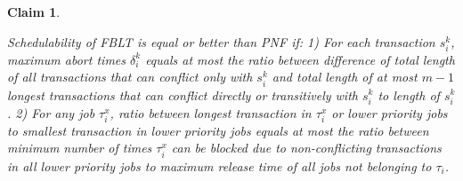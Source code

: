 \documentclass[conference,letterpaper]{IEEEtran}
\newtheorem{clm}{Claim}
\begin{document}

%

%
\begin{clm}\label{clm:fblt_pnf_edf}

Schedulability of FBLT is equal or better than PNF if: 1) For each
transaction $s_{i}^{k}$, maximum abort times $\delta_{i}^{k}$ equals
at most the ratio between difference of total length of all transactions
that can conflict only with $s_{i}^{k}$ and total length of at most
$m-1$ longest transactions that can conflict directly or transitively
with $s_{i}^{k}$ to length of $s_{i}^{k}$. 2) For any job $\tau_{i}^{x}$,
ratio between longest transaction in $\tau_{i}^{x}$ or lower priority
jobs to smallest transaction in lower priority jobs equals at most
the ratio between minimum number of times $\tau_{i}^{x}$ can be blocked
due to non-conflicting transactions in all lower priority jobs to
maximum release time of all jobs not belonging to $\tau_{i}$.

\end{clm}
\end{document}
